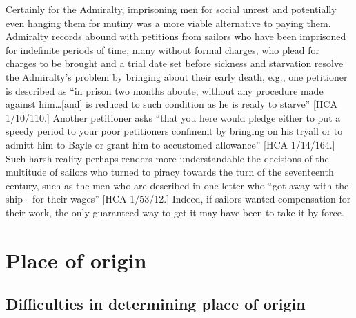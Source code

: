 Certainly for the Admiralty, imprisoning men for social unrest and potentially even hanging them for mutiny was a more viable alternative to paying them. Admiralty records abound with petitions from sailors who have been imprisoned for indefinite periods of time, many without formal charges, who plead for charges to be brought and a trial date set before sickness and starvation resolve the Admiralty’s problem by bringing about their early death, e.g., one petitioner is described as “in prison two months aboute, without any procedure made against him…[and] is reduced to such condition as he is ready to starve” [HCA 1/10/110.] Another petitioner asks “that you here would pledge either to put a speedy period to your poor petitioners confinemt by bringing on his tryall or to admitt him to Bayle or grant him to accustomed allowance” [HCA 1/14/164.] Such harsh reality perhaps renders more understandable the decisions of the multitude of sailors who turned to piracy towards the turn of the seventeenth century, such as the men who are described in one letter who “got away with the ship - for their wages” [HCA 1/53/12.] Indeed, if sailors wanted compensation for their work, the only guaranteed way to get it may have been to take it by force. 

\section{\textbf{Place} \textbf{of} \textbf{origin} }%


\subsection{\textbf{Difficulties} \textbf{in} \textbf{determining} \textbf{place} \textbf{of} \textbf{origin}}%


